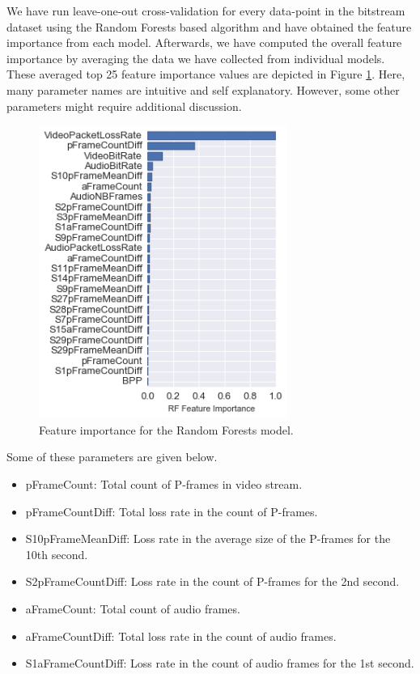 \documentclass[journal]{IEEEtran}
\begin{document}
We have run leave-one-out cross-validation for every data-point in the bitstream dataset using the Random Forests based algorithm and have obtained the feature importance from each model. Afterwards, we have computed the overall feature importance by averaging the data we have collected from individual models. These averaged top 25 feature importance values are depicted in Figure \ref{fig:RFFeatures}. Here, many parameter names are intuitive and self explanatory. However, some other parameters might require additional discussion. 

\begin{figure}[ht!]
\includegraphics[width=3.2in]{./rffi.png}
\caption{Feature importance for the Random Forests model.}
\label{fig:RFFeatures}
\end{figure}

Some of these parameters are given below.

\begin{itemize}

\item pFrameCount: Total count of P-frames in video stream.

\item pFrameCountDiff: Total loss rate in the count of P-frames.

\item S10pFrameMeanDiff: Loss rate in the average size of the P-frames for the 10th second.

\item S2pFrameCountDiff: Loss rate in the count of P-frames for the 2nd second.

\item aFrameCount: Total count of audio frames.

\item aFrameCountDiff: Total loss rate in the count of audio frames.

\item S1aFrameCountDiff: Loss rate in the count of audio frames for the 1st second.

\end{itemize}
\end{document}
